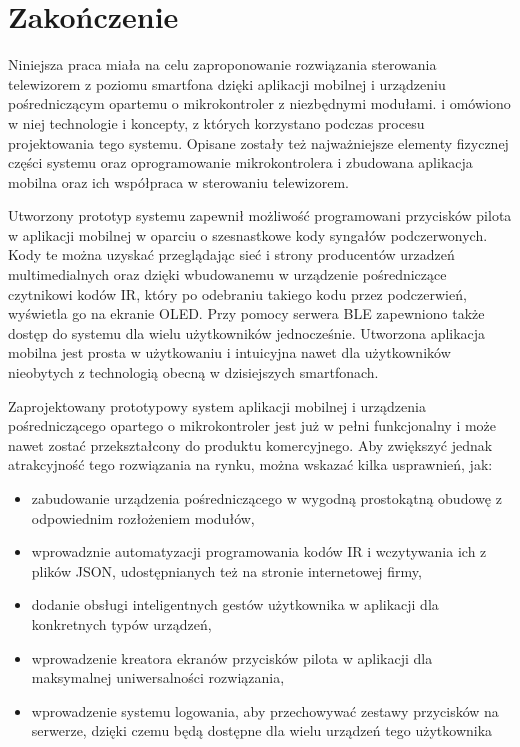 \documentclass[12pt,twoside]{article}
\begin{document}
\clearpage

\section{Zakończenie}

Niniejsza praca miała na celu zaproponowanie rozwiązania sterowania telewizorem z poziomu smartfona dzięki aplikacji mobilnej i urządzeniu pośredniczącym opartemu o mikrokontroler z niezbędnymi modułami.  i omówiono w niej technologie i koncepty, z których korzystano podczas procesu projektowania tego systemu. Opisane zostały też najważniejsze elementy fizycznej części systemu oraz oprogramowanie mikrokontrolera i zbudowana aplikacja mobilna oraz ich współpraca w sterowaniu telewizorem.

Utworzony prototyp systemu zapewnił możliwość programowani przycisków pilota w aplikacji mobilnej w oparciu o szesnastkowe kody syngałów podczerwonych. Kody te można uzyskać przeglądając sieć i strony producentów urzadzeń multimedialnych oraz dzięki wbudowanemu w urządzenie pośredniczące czytnikowi kodów IR, który po odebraniu takiego kodu przez podczerwień, wyświetla go na ekranie OLED. Przy pomocy serwera BLE zapewniono także dostęp do systemu dla wielu użytkowników jednocześnie. Utworzona aplikacja mobilna jest prosta w użytkowaniu i intuicyjna nawet dla użytkowników nieobytych z technologią obecną w dzisiejszych smartfonach.

Zaprojektowany prototypowy system aplikacji mobilnej i urządzenia pośredniczącego opartego o mikrokontroler jest już w pełni funkcjonalny i może nawet zostać przekształcony do produktu komercyjnego. Aby zwiększyć jednak atrakcyjność tego rozwiązania na rynku, można wskazać kilka usprawnień, jak:
\begin{itemize}[label=-,labelsep=0.4cm,leftmargin=0.65cm]
   \item zabudowanie urządzenia pośredniczącego w wygodną prostokątną obudowę z odpowiednim rozłożeniem modułów,
   \item wprowadznie automatyzacji programowania kodów IR i wczytywania ich z plików JSON, udostępnianych też na stronie internetowej firmy,
   \item dodanie obsługi inteligentnych gestów użytkownika w aplikacji dla konkretnych typów urządzeń,
   \item wprowadzenie kreatora ekranów przycisków pilota w aplikacji dla maksymalnej uniwersalności rozwiązania,
   \item wprowadzenie systemu logowania, aby przechowywać zestawy przycisków na serwerze, dzięki czemu będą dostępne dla wielu urządzeń tego użytkownika
   
\end{itemize}
\end{document}
